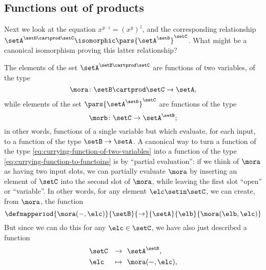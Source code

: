 \begin{solution}
\end{solution}

\subsection{Functions out of products}

Next we look at the equation $x^{y \cdot z} = (x^y)^z$, and the corresponding relationship $ \setA^{\setB \cartprod \setC}  \isomorphic \pars{\setA^\setB}^\setC$. What might be a canonical isomorphism proving this latter relationship?

The elements of the set $ \setA^{\setB \cartprod \setC}$ are functions of two variables, of the type
\begin{equation}\label{eq:currying-function-of-two-variables}
\mora \colon \setB \cartprod \setC \to \setA, 
\end{equation}
while elements of the set $\pars{\setA^\setB}^\setC$ are functions of the type
\begin{equation} \label{eq:currying-function-to-functions}
\morb \colon \setC \to \setA^\setB;
\end{equation}
in other words, functions of a single variable but which evaluate, for each input, to a function of the type $\setB \to \setA$. A canonical way to turn a function of the type \cref{eq:currying-function-of-two-variables} into a function of the type \cref{eq:currying-function-to-functoins} is by ``partial evaluation'': if we think of $\mora$ as having two input slots, we can partially evaluate $\mora$ by inserting an element of $\setC$ into the second slot of $\mora$, while leaving the first slot ``open'' or ``variable''. In other words, for any element $\elc \setin \setC$, we can create, from $\mora$, the function 
\begin{equation}
 \defmapperiod{
           \mora( -, \elc)
        }{
            \setB 
        }{
            \to
        }{
           \setA 
        }{
            \elb
        }{
            \mora (\elb, \elc)
        }
\end{equation}
But since we can do this for any $\elc \in \setC$, we have also just described a function
\begin{equation}
\begin{aligned}
          & \setC & \to & \ \ \setA^\setB, \\
         & \elc & \mapsto & \ \  \mora ( -, \elc),
\end{aligned}
\end{equation}
